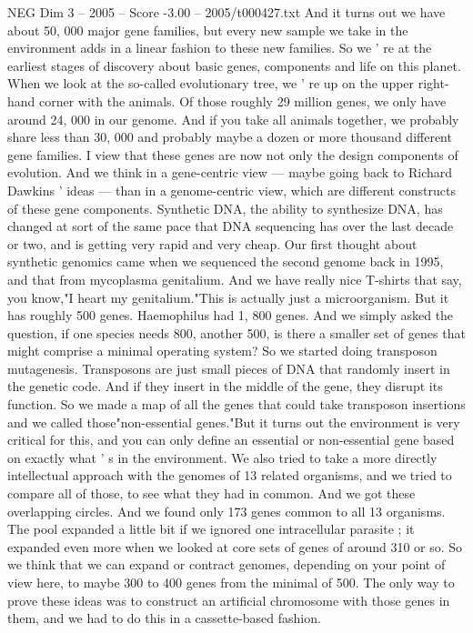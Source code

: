 \begin{textsample}{NEG Dim 3 – 2005 – Score -3.00 – 2005/t000427.txt}
And it turns out we have about 50, 000 major gene families, but every new sample we take in the environment adds in a linear fashion to these new families.
So we ' re at the earliest stages of discovery about basic genes, components and life on this planet.
When we look at the so-called evolutionary tree, we ' re up on the upper right- hand corner with the animals.
Of those roughly 29 million genes, we only have around 24, 000 in our genome.
And if you take all animals together, we probably share less than 30, 000 and probably maybe a dozen or more thousand different gene families.
I view that these genes are now not only the design components of evolution.
And we think in a gene-centric view — maybe going back to Richard Dawkins ' ideas — than in a genome-centric view, which are different constructs of these gene components.
Synthetic DNA, the ability to synthesize DNA, has changed at sort of the same pace that DNA sequencing has over the last decade or two, and is getting very rapid and very cheap.
Our first thought about synthetic genomics came when we sequenced the second genome back in 1995, and that from mycoplasma genitalium.
And we have really nice T-shirts that say, you know,"I heart my genitalium."This is actually just a microorganism.
But it has roughly 500 genes.
Haemophilus had 1, 800 genes.
And we simply asked the question, if one species needs 800, another 500, is there a smaller set of genes that might comprise a minimal operating system?
So we started doing transposon mutagenesis.
Transposons are just small pieces of DNA that randomly insert in the genetic code.
And if they insert in the middle of the gene, they disrupt its function.
So we made a map of all the genes that could take transposon insertions and we called those"non-essential genes."But it turns out the environment is very critical for this, and you can only define an essential or non-essential gene based on exactly what ' s in the environment.
We also tried to take a more directly intellectual approach with the genomes of 13 related organisms, and we tried to compare all of those, to see what they had in common.
And we got these overlapping circles.
And we found only 173 genes common to all 13 organisms.
The pool expanded a little bit if we ignored one intracellular parasite ; it expanded even more when we looked at core sets of genes of around 310 or so.
So we think that we can expand or contract genomes, depending on your point of view here, to maybe 300 to 400 genes from the minimal of 500.
The only way to prove these ideas was to construct an artificial chromosome with those genes in them, and we had to do this in a cassette-based fashion.

\end{textsample}
